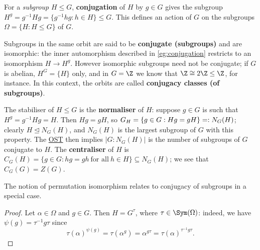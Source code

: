 \begin{example}\label{eg:conjugation_subgroups}
    For a \textit{subgroup} $H \leq G$, \textbf{conjugation} of $H$ by $g \in G$ gives the subgroup $H^g = g^{-1}Hg = \{g^{-1}hg : h \in H\} \leq G$. This defines an action of $G$ on the subgroups $\Omega = \{H : H \leq G\}$ of $G$.

    Subgroups in the same orbit are said to be \textbf{conjugate (subgroups)} and are isomorphic: the inner automorphism described in \autoref{eg:conjugation} restricts to an isomorphism $H \to H^g$. However isomorphic subgroups need not be conjugate; if $G$ is abelian, $H^G = \{H\}$ only, and in $G = \Z$ we know that $\Z \cong 2\Z \leq \Z$, for instance. In this context, the orbits are called \textbf{conjugacy classes (of subgroups)}.

    The stabiliser of $H \leq G$ is the \textbf{normaliser} of $H$: suppose $g \in G$ is such that $H^g = g^{-1}H g = H$. Then $Hg = gH$, so $\added{2}{G_H} = \{g \in G : Hg = gH\} =: N_G(H)$; clearly $H \trianglelefteq N_G(H)$, and $N_G(H)$ is the largest subgroup of $G$ with this property. The \hyperref[thm:orbit_stabiliser]{OST} then implies $|G : N_G(H)|$ is the number of subgroups of $G$ conjugate to $H$. The \textbf{centraliser} of $H$ is $C_G(H) = \{g \in G : hg = gh\ \text{for all}\ h \in H\} \subseteq N_G(H)$; we see that $C_G(G) = Z(G)$.
\end{example}

The notion of permutation isomorphism relates to conjugacy of subgroups in a special case.


\begin{proof}
    Let $\alpha \in \Omega$ and $g \in G$. Then $H = G^\tau$, where $\tau \in \Sym(\Omega)$: indeed, we have $\psi(g) = \tau^{-1}g\tau$ since
    \[\tau(\alpha)^{\psi(g)} = \tau(\alpha^g) = \alpha^{g\tau} = \tau(\alpha)^{\tau^{-1}g\tau}.\]
\end{proof}


